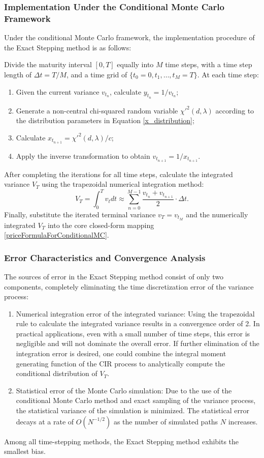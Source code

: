 \subsubsection{Implementation Under the Conditional Monte Carlo Framework}
Under the conditional Monte Carlo framework, the implementation procedure of the Exact Stepping method is as follows:

Divide the maturity interval $[0,T]$ equally into $M$ time steps, with a time step length of $\Delta t = T/M$, and a time grid of $\{t_0=0,t_1,\ldots,t_M=T\}$. At each time step:
\begin{enumerate}
  \item Given the current variance $v_{t_n}$, calculate $y_{t_n} = 1/v_{t_n}$;
  \item Generate a non-central chi-squared random variable $\chi'^2(d,\lambda)$ according to the distribution parameters in Equation \eqref{x_distribution};
  \item Calculate $x_{t_{n+1}} = \chi'^2(d,\lambda)/c$;
  \item Apply the inverse transformation to obtain $v_{t_{n+1}} = 1/x_{t_{n+1}}$.
\end{enumerate}
After completing the iterations for all time steps, calculate the integrated variance $V_T$ using the trapezoidal numerical integration method:
\begin{equation}
  V_T = \int_0^T v_t dt \approx \sum_{n=0}^{M-1} \frac{v_{t_n} + v_{t_{n+1}}}{2} \cdot \Delta t.
\end{equation}
Finally, substitute the iterated terminal variance $v_T = v_{t_M}$ and the numerically integrated $V_T$ into the core closed-form mapping \eqref{priceFormulaForConditionalMC}.

\subsubsection{Error Characteristics and Convergence Analysis}
The sources of error in the Exact Stepping method consist of only two components, completely eliminating the time discretization error of the variance process:
\begin{enumerate}
  \item Numerical integration error of the integrated variance: Using the trapezoidal rule to calculate the integrated variance results in a convergence order of 2. In practical applications, even with a small number of time steps, this error is negligible and will not dominate the overall error. If further elimination of the integration error is desired, one could combine the integral moment generating function of the CIR process to analytically compute the conditional distribution of $V_T$.
  \item Statistical error of the Monte Carlo simulation: Due to the use of the conditional Monte Carlo method and exact sampling of the variance process, the statistical variance of the simulation is minimized. The statistical error decays at a rate of $O(N^{-1/2})$ as the number of simulated paths $N$ increases.
\end{enumerate}
Among all time-stepping methods, the Exact Stepping method exhibits the smallest bias.

